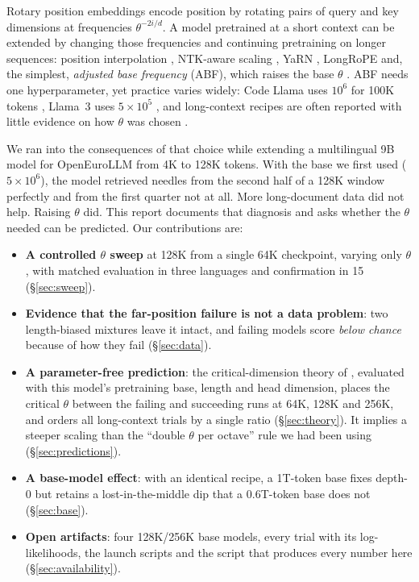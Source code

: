 \documentclass[11pt]{article}
\begin{document}
Rotary position embeddings \citep[RoPE;][]{su2024roformer} encode position by rotating pairs of query and key dimensions at frequencies $\theta^{-2i/d}$. A model pretrained at a short context can be extended by changing those frequencies and continuing pretraining on longer sequences: position interpolation \citep{chen2023pi}, NTK-aware scaling \citep{bloc97ntk}, YaRN \citep{peng2024yarn}, LongRoPE \citep{ding2024longrope,shang2025longrope2} and, the simplest, \emph{adjusted base frequency} (ABF), which raises the base $\theta$ \citep{xiong2024effective,roziere2023codellama,dubey2024llama3}. ABF needs one hyperparameter, yet practice varies widely: Code Llama uses $10^6$ for 100K tokens \citep{roziere2023codellama}, Llama~3 uses $5\times10^5$ \citep{dubey2024llama3}, and long-context recipes are often reported with little evidence on how $\theta$ was chosen \citep{fu2024data,gao2025prolong}.

We ran into the consequences of that choice while extending a multilingual 9B model for OpenEuroLLM \citep{openeurollm2025} from 4K to 128K tokens. With the base we first used ($5\times10^6$), the model retrieved needles from the second half of a 128K window perfectly and from the first quarter not at all. More long-document data did not help. Raising $\theta$ did. This report documents that diagnosis and asks whether the $\theta$ needed can be predicted. Our contributions are:
\begin{itemize}
\item \textbf{A controlled $\theta$ sweep} at 128K from a single 64K checkpoint, varying only $\theta$, with matched evaluation in three languages and confirmation in 15 (\S\ref{sec:sweep}).
\item \textbf{Evidence that the far-position failure is not a data problem}: two length-biased mixtures leave it intact, and failing models score \emph{below chance} because of how they fail (\S\ref{sec:data}).
\item \textbf{A parameter-free prediction}: the critical-dimension theory of \citet{liu2024scalinglaws}, evaluated with this model's pretraining base, length and head dimension, places the critical $\theta$ between the failing and succeeding runs at 64K, 128K and 256K, and orders all \nRatioTrials{} long-context trials by a single ratio (\S\ref{sec:theory}). It implies a steeper scaling than the ``double $\theta$ per octave'' rule we had been using (\S\ref{sec:predictions}).
\item \textbf{A base-model effect}: with an identical recipe, a 1T-token base fixes depth-0 but retains a lost-in-the-middle dip that a 0.6T-token base does not (\S\ref{sec:base}).
\item \textbf{Open artifacts}: four 128K/256K base models, every trial with its log-likelihoods, the launch scripts and the script that produces every number here (\S\ref{sec:availability}).
\end{itemize}
\end{document}
